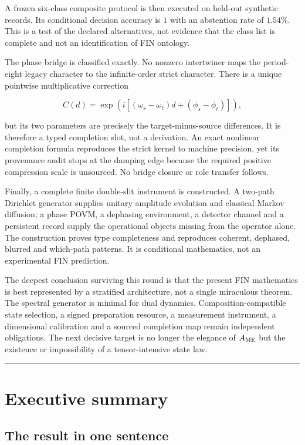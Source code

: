 \documentclass[11pt,a4paper,openany]{report}
\begin{document}
A frozen six-class composite protocol is then executed on held-out synthetic records. Its conditional decision accuracy is \(1\) with an abstention rate of \(1.54\%\). This is a test of the declared alternatives, not evidence that the class list is complete and not an identification of FIN ontology.

The phase bridge is classified exactly. No nonzero intertwiner maps the period-eight legacy character to the infinite-order strict character. There is a unique pointwise multiplicative correction

\[
C(d)=
\exp\!\left(
i[(\omega_s-\omega_\ell)d+(\phi_s-\phi_\ell)]
\right),
\]

but its two parameters are precisely the target-minus-source differences. It is therefore a typed completion slot, not a derivation. An exact nonlinear completion formula reproduces the strict kernel to machine precision, yet its provenance audit stops at the damping edge because the required positive compression scale is unsourced. No bridge closure or role transfer follows.

Finally, a complete finite double-slit instrument is constructed. A two-path Dirichlet generator supplies unitary amplitude evolution and classical Markov diffusion; a phase POVM, a dephasing environment, a detector channel and a persistent record supply the operational objects missing from the operator alone. The construction proves type completeness and reproduces coherent, dephased, blurred and which-path patterns. It is conditional mathematics, not an experimental FIN prediction.

The deepest conclusion surviving this round is that the present FIN mathematics is best represented by a stratified architecture, not a single miraculous theorem. The spectral generator is minimal for dual dynamics. Composition-compatible state selection, a signed preparation resource, a measurement instrument, a dimensional calibration and a sourced completion map remain independent obligations. The next decisive target is no longer the elegance of \(A_{\rm ME}\) but the existence or impossibility of a tensor-intensive state law.

\par\medskip\hrule\medskip

\chapter{Executive summary}

\section{The result in one sentence}
\end{document}
